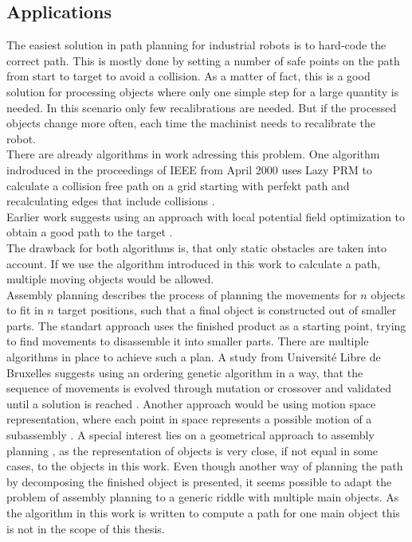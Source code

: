 \subsection{Applications}
The easiest solution in path planning for industrial robots is to hard-code the correct path. This is mostly done by setting a number of safe points on the path from start to target to avoid a collision. As a matter of fact, this is a good solution for processing objects where only one simple step for a large quantity is needed. In this scenario only few recalibrations are needed. But if the processed objects change more often, each time the machinist needs to recalibrate the robot. \\
There are already algorithms in work adressing this problem. One algorithm indroduced in the proceedings of IEEE from April 2000 uses Lazy PRM to calculate a collision free path on a grid starting with perfekt path and recalculating edges that include collisions \cite{lazyPRM}.\\
Earlier work suggests using an approach with local potential field optimization to obtain a good path to the target \cite{potField}.\\
The drawback for both algorithms is, that only static obstacles are taken into account. If we use the algorithm introduced in this work to calculate a path, multiple moving objects would be allowed.\\
\newline
Assembly planning describes the process of planning the movements for $n$ objects to fit in $n$ target positions, such that a final object  is constructed out of smaller parts. The standart approach uses the finished product as a starting point, trying to find movements to disassemble it into smaller parts. There are multiple algorithms in place to achieve such a plan. A study from Université Libre de Bruxelles suggests using an ordering genetic algorithm in a way, that the sequence of movements is evolved through mutation or crossover and validated until a solution is reached \cite{genAssembly}. Another approach would be using motion space representation, where each point in space represents a possible motion of a subassembly \cite{motionAssembly}. A special interest lies on a geometrical approach to assembly planning \cite{geoAssembly}, as the representation of objects is very close, if not equal in some cases, to the objects in this work. Even though another way of planning the path by decomposing the finished object is presented, it seems possible to adapt the problem of assembly planning to a generic riddle with multiple main objects. As the algorithm in this work is written to compute a path for one main object this is not in the scope of this thesis.\\
